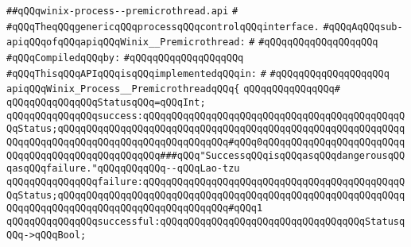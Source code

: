 \label{src/lib/std/src/winix/winix-process--premicrothread.api}
\verb|##qQQqwinix-process--premicrothread.api|\newline
\verb|#|\newline
\verb|#qQQqTheqQQqgenericqQQqprocessqQQqcontrolqQQqinterface.|\newline
\verb|#qQQqAqQQqsub-apiqQQqofqQQqapiqQQqWinix__Premicrothread:|\newline
\verb|#|\newline
\verb|#qQQqqQQqqQQqqQQqqQQq|\newline
\newline
\verb|#qQQqCompiledqQQqby:|\newline
\verb|#qQQqqQQqqQQqqQQqqQQq|\newline
\newline
\newline
\verb|#qQQqThisqQQqAPIqQQqisqQQqimplementedqQQqin:|\newline
\verb|#|\newline
\verb|#qQQqqQQqqQQqqQQqqQQq|\newline
\newline
\verb|apiqQQqWinix_Process__PremicrothreadqQQq{|\newline
\verb|qQQqqQQqqQQqqQQq#|\newline
\verb|qQQqqQQqqQQqqQQqStatusqQQq=qQQqInt;|\newline
\newline
\verb|qQQqqQQqqQQqqQQqsuccess:qQQqqQQqqQQqqQQqqQQqqQQqqQQqqQQqqQQqqQQqqQQqqQQqStatus;qQQqqQQqqQQqqQQqqQQqqQQqqQQqqQQqqQQqqQQqqQQqqQQqqQQqqQQqqQQqqQQqqQQqqQQqqQQqqQQqqQQqqQQqqQQqqQQqqQQq#qQQq0qQQqqQQqqQQqqQQqqQQqqQQqqQQqqQQqqQQqqQQqqQQqqQQqqQQq###qQQq"SuccessqQQqisqQQqasqQQqdangerousqQQqasqQQqfailure."qQQqqQQqqQQq--qQQqLao-tzu|\newline
\verb|qQQqqQQqqQQqqQQqfailure:qQQqqQQqqQQqqQQqqQQqqQQqqQQqqQQqqQQqqQQqqQQqqQQqStatus;qQQqqQQqqQQqqQQqqQQqqQQqqQQqqQQqqQQqqQQqqQQqqQQqqQQqqQQqqQQqqQQqqQQqqQQqqQQqqQQqqQQqqQQqqQQqqQQqqQQq#qQQq1|\newline
\newline
\verb|qQQqqQQqqQQqqQQqsuccessful:qQQqqQQqqQQqqQQqqQQqqQQqqQQqqQQqqQQqStatusqQQq->qQQqBool;|\newline
